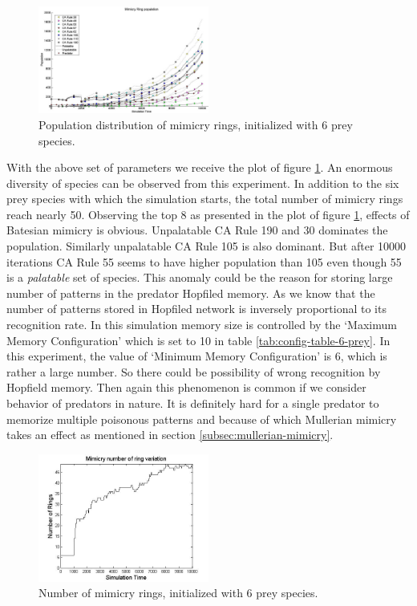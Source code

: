 \documentclass[letterpaper]{article}
\numberwithin{equation}{section}
\begin{document}
\begin{figure}[H]
	\centering
	\includegraphics[width=0.5\textwidth]{../tex/images/simTime10k-6Prey}
	\caption[Population distribution of mimicry rings (6 prey species)]{Population distribution of mimicry rings, initialized with 6 prey species.}
	\label{fig:plot-6-prey}
\end{figure}

With the above set of parameters we receive the plot of figure \ref{fig:plot-6-prey}. An enormous diversity of species can be observed from this experiment. In addition to the six prey species with which the simulation starts, the total number of mimicry rings reach nearly 50. Observing the top 8 as presented in the plot of figure \ref{fig:plot-6-prey}, effects of Batesian mimicry is obvious. Unpalatable CA Rule 190 and 30 dominates the population. Similarly unpalatable CA Rule 105 is also dominant. But after 10000 iterations CA Rule 55 seems to have higher population than 105 even though 55 is a \textsl{palatable} set of species. This anomaly could be the reason for storing large number of patterns in the predator Hopfiled memory. As we know that the number of patterns stored in Hopfiled network is inversely proportional to its recognition rate. In this simulation memory size is controlled by the `Maximum Memory Configuration' which is set to 10 in table \ref{tab:config-table-6-prey}. In this experiment, the value of `Minimum Memory Configuration' is 6, which is rather a large number. So there could be possibility of wrong recognition by Hopfield memory. Then again this phenomenon is common if we consider behavior of predators in nature. It is definitely hard for a single predator to memorize multiple poisonous patterns and because of which Mullerian mimicry takes an effect as mentioned in section \ref{subsec:mullerian-mimicry}.

\begin{figure}[h]
	\centering
	\includegraphics[width=0.5\textwidth]{../tex/images/ringSize10k-6Prey}
	\caption[Number of mimicry rings (6 prey species)]{Number of mimicry rings, initialized with 6 prey species.}
	\label{fig:ringSize10k-6-Prey}
\end{figure}
\end{document}
